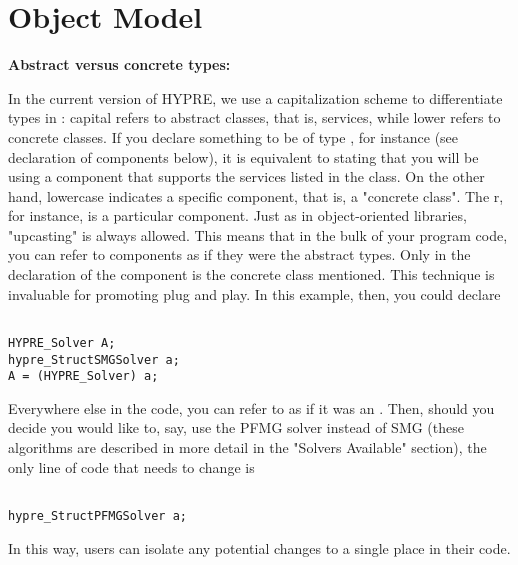 \section{Object Model}
\label{Object Model}


{\bf Abstract versus concrete types:} 

In the current version of HYPRE, we use a capitalization scheme
to differentiate types in 
\hypre{}: capital  refers to abstract classes, that is, services,
while lower  refers to concrete classes. 
If you
declare something to be of 
type , for instance (see declaration of components below), it is
equivalent to stating that you 
will be using a component that supports the services listed in the 
class. On the other hand, 
lowercase  indicates a specific component, that is, a "concrete class".
The r, 
for instance, is a particular component. Just as in object-oriented libraries,
"upcasting" is always allowed. 
This means that in the bulk of your program code, you can refer to components
as if they were the abstract 
types. Only in the declaration of the component is the concrete class
mentioned. This technique is 
invaluable for promoting plug and play. In this example, then, you could
declare 

\begin{display}
\begin{verbatim}

HYPRE_Solver A; 
hypre_StructSMGSolver a; 
A = (HYPRE_Solver) a; 

\end{verbatim}
\end{display}

Everywhere else in the code, you
can refer to  as if it 
was an . Then, should you decide you would like to, say, 
use the PFMG solver
instead of SMG (these 
algorithms are described in more detail in the "Solvers Available" section),
the only line of code that needs 
to change is 

\begin{display}
\begin{verbatim}

hypre_StructPFMGSolver a;

\end{verbatim}
\end{display}

In this way, users can isolate any
potential changes to a single 
place in their code.


